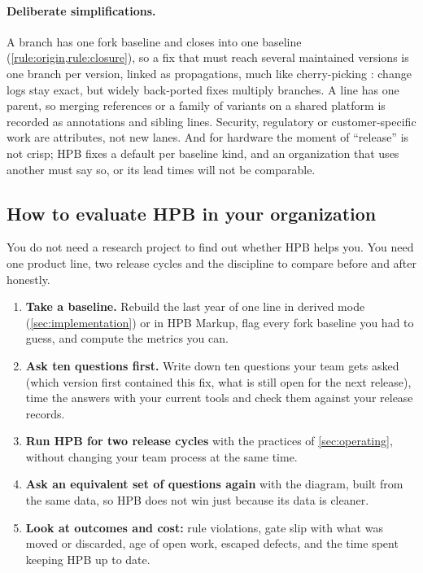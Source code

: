 \paragraph{Deliberate simplifications.}
A branch has one fork baseline and closes into one baseline
(\cref{rule:origin,rule:closure}), so a fix that must reach several
maintained versions is one branch per version, linked as propagations,
much like cherry-picking \citep{chacon2014progit}: change logs stay exact,
but widely back-ported fixes multiply branches. A line has one parent, so
merging references or a family of variants on a shared platform is
recorded as annotations and sibling lines. Security, regulatory or
customer-specific work are attributes, not new lanes. And for hardware the
moment of ``release'' is not crisp; HPB fixes a default per baseline kind,
and an organization that uses another must say so, or its lead times will
not be comparable.

\subsection{How to evaluate HPB in your organization}
\label{sec:limitations-evaluate}

You do not need a research project to find out whether HPB helps you. You
need one product line, two release cycles and the discipline to compare
before and after honestly.
\begin{enumerate}[leftmargin=1.8em,itemsep=1pt,topsep=3pt]
  \item \textbf{Take a baseline.} Rebuild the last year of one line in
        derived mode (\cref{sec:implementation}) or in HPB Markup, flag
        every fork baseline you had to guess, and compute the metrics you
        can.
  \item \textbf{Ask ten questions first.} Write down ten questions your
        team gets asked (which version first contained this fix, what is
        still open for the next release), time the answers with your
        current tools and check them against your release records.
  \item \textbf{Run HPB for two release cycles} with the practices of
        \cref{sec:operating}, without changing your team process at the
        same time.
  \item \textbf{Ask an equivalent set of questions again} with the
        diagram, built from the same data, so HPB does not win just because
        its data is cleaner.
  \item \textbf{Look at outcomes and cost:} rule violations, gate slip with
        what was moved or discarded, age of open work, escaped defects, and
        the time spent keeping HPB up to date.
\end{enumerate}

